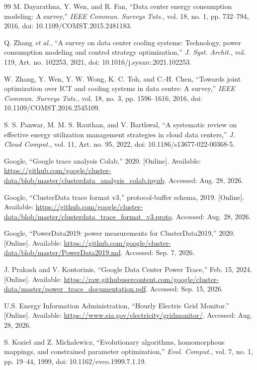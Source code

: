 \documentclass{UNCC-thesis}
\begin{document}
\begin{thebibliography}{99}
M. Dayarathna, Y. Wen, and R. Fan, ``Data center energy consumption modeling:
A survey,'' \emph{IEEE Commun. Surveys Tuts.}, vol. 18, no. 1, pp. 732--794,
2016, doi: 10.1109/COMST.2015.2481183.

Q. Zhang \emph{et al.}, ``A survey on data center cooling systems: Technology, power
consumption modeling and control strategy optimization,'' \emph{J. Syst.
Archit.}, vol. 119, Art. no. 102253, 2021,
doi: 10.1016/j.sysarc.2021.102253.

W. Zhang, Y. Wen, Y. W. Wong, K. C. Toh, and C.-H. Chen, ``Towards joint
optimization over ICT and cooling systems in data centre: A survey,''
\emph{IEEE Commun. Surveys Tuts.}, vol. 18, no. 3, pp. 1596--1616, 2016,
doi: 10.1109/COMST.2016.2545109.

S. S. Panwar, M. M. S. Rauthan, and V. Barthwal, ``A systematic review on
effective energy utilization management strategies in cloud data centers,''
\emph{J. Cloud Comput.}, vol. 11, Art. no. 95, 2022,
doi: 10.1186/s13677-022-00368-5.

Google, ``Google trace analysis Colab,'' 2020. [Online]. Available:
\url{https://github.com/google/cluster-data/blob/master/clusterdata_analysis_colab.ipynb}.
Accessed: Aug. 28, 2026.

Google, ``ClusterData trace format v3,'' protocol-buffer schema, 2019.
[Online]. Available:
\url{https://github.com/google/cluster-data/blob/master/clusterdata_trace_format_v3.proto}.
Accessed: Aug. 28, 2026.

Google, ``PowerData2019: power measurements for ClusterData2019,'' 2020.
[Online]. Available:
\url{https://github.com/google/cluster-data/blob/master/PowerData2019.md}.
Accessed: Sep. 7, 2026.

J. Prakash and V. Kontorinis, ``Google Data Center Power Trace,''
Feb. 15, 2024. [Online]. Available:
\url{https://raw.githubusercontent.com/google/cluster-data/master/power_trace_documentation.pdf}.
Accessed: Sep. 15, 2026.

U.S. Energy Information Administration, ``Hourly Electric Grid Monitor.''
[Online]. Available: \url{https://www.eia.gov/electricity/gridmonitor/}.
Accessed: Aug. 28, 2026.

S. Kozie{\l} and Z. Michalewicz, ``Evolutionary algorithms, homomorphous mappings, and
constrained parameter optimization,'' \emph{Evol. Comput.}, vol. 7, no. 1, pp. 19--44, 1999,
doi: 10.1162/evco.1999.7.1.19.


\end{thebibliography}
\end{document}
